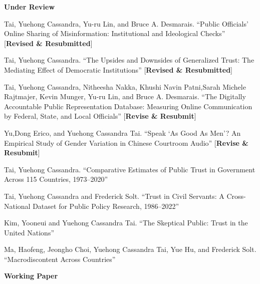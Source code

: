 \documentclass[10.5pt,]{article}
\providecommand{\tightlist}{%
	\setlength{\itemsep}{0pt}\setlength{\parskip}{0pt}}
\renewenvironment{itemize}{
	\begin{list}{}{
			\setlength{\leftmargin}{1.5em}
		}
	}{
	\end{list}
}
\begin{document}
\begin{itemize}
\tightlist
\item
  \textbf{Under Review}

  \begin{itemize}
  \tightlist
  \item
    Tai, Yuehong Cassandra, Yu-ru Lin, and Bruce A. Desmarais. ``Public
    Oﬀicials' Online Sharing of Misinformation: Institutional and
    Ideological Checks'' {[}\textbf{Revised \& Resubmitted}{]}
  \item
    Tai, Yuehong Cassandra. ``The Upsides and Downsides of Generalized
    Trust: The Mediating Effect of Democratic Institutions''
    {[}\textbf{Revised \& Resubmitted}{]}
  \item
    Tai, Yuehong Cassandra, Nitheesha Nakka, Khushi Navin Patni,Sarah
    Michele Rajtmajer, Kevin Munger, Yu-ru Lin, and Bruce A. Desmarais.
    ``The Digitally Accountable Public Representation Database:
    Measuring Online Communication by Federal, State, and Local
    Oﬀicials'' {[}\textbf{Revise \& Resubmit}{]}
  \item
    Yu,Dong Erico, and Yuehong Cassandra Tai. ``Speak `As Good As Men'?
    An Empirical Study of Gender Variation in Chinese Courtroom Audio''
    {[}\textbf{Revise \& Resubmit}{]}
  \item
    Tai, Yuehong Cassandra. ``Comparative Estimates of Public Trust in
    Government Across 115 Countries, 1973--2020''
  \item
    Tai, Yuehong Cassandra and Frederick Solt. ``Trust in Civil
    Servants: A Cross-National Dataset for Public Policy Research,
    1986--2022''
  \item
    Kim, Yooneui and Yuehong Cassandra Tai. ``The Skeptical Public:
    Trust in the United Nations''
  \item
    Ma, Haofeng, Jeongho Choi, Yuehong Cassandra Tai, Yue Hu, and
    Frederick Solt. ``Macrodiscontent Across Countries''
  \end{itemize}
\item
  \textbf{Working Paper}


\end{itemize}
\end{document}
